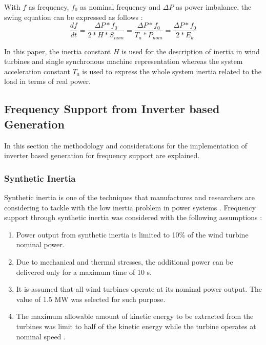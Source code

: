 With $f$ as frequency, $f_0$ as nominal frequency and $\Delta P$ as power imbalance, the swing equation can be expressed as follows \cite{kundur1994power}:
\begin{equation}
	\label{eq:swing}
	\frac{df}{dt}=\dfrac{\Delta P*f_0}{2*H*S_{nom}}=\frac{\Delta P*f_0}{T_a*P_{nom}}=\frac{\Delta P*f_0}{2*E_k}
\end{equation}

In this paper, the inertia constant $ H $ is used for the description of inertia in wind turbines and single synchronous machine representation whereas the system acceleration constant $ T_a $ is used to express the whole system inertia related to the load in terms of real power.

\subsection{Frequency Support from Inverter based Generation}

In this section the methodology and considerations for the implementation of inverter based generation for frequency support are explained.
 
\subsubsection{Synthetic Inertia}

Synthetic inertia is one of the techniques that manufactures and researchers are considering to tackle with the low inertia problem in power systems \cite{Gevorgian.2017, GeneralElectricInternational.2013}. Frequency support through synthetic inertia was considered with the following assumptions \cite{dreidy2017inertia, nesje2015need}:
\begin{enumerate}[leftmargin=*,labelsep=4.9mm]
	\item Power output from synthetic inertia is limited to 10\% of the wind turbine nominal power.
	\item Due to mechanical and thermal stresses, the additional power can be delivered only for a maximum time of 10 s.
	\item It is assumed that all wind turbines operate at its nominal power output. The value of 1.5 MW was selected for such purpose.
	\item The maximum allowable amount of kinetic energy to be extracted from the turbines was limit to half of the kinetic energy while the turbine operates at nominal speed \cite{NREL.2012}.

\end{enumerate}

